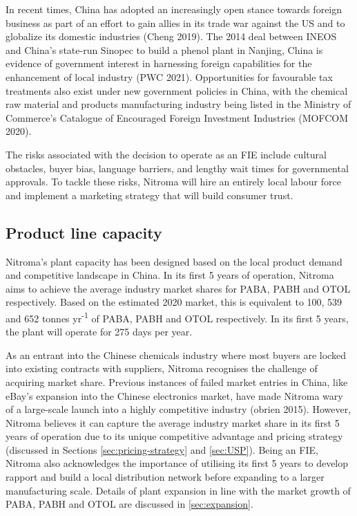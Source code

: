 In recent times, China has adopted an increasingly open stance towards foreign business as part of an effort to gain allies in its trade war against the US and to globalize its domestic industries (Cheng 2019). The 2014 deal between INEOS and China’s state-run Sinopec to build a phenol plant in Nanjing, China is evidence of government interest in harnessing foreign capabilities for the enhancement of local industry (PWC 2021). Opportunities for favourable tax treatments also exist under new government policies in China, with the chemical raw material and products manufacturing industry being listed in the Ministry of Commerce’s Catalogue of Encouraged Foreign Investment Industries (MOFCOM 2020). 

The risks associated with the decision to operate as an FIE include cultural obstacles, buyer bias, language barriers, and lengthy wait times for governmental approvals. To tackle these risks, Nitroma will hire an entirely local labour force and implement a marketing strategy that will build consumer trust.

\subsection{Product line capacity}
\label{sec:product-capacity}
Nitroma’s plant capacity has been designed based on the local product demand and competitive landscape in China. In its first 5 years of operation, Nitroma aims to achieve the average industry market shares for PABA, PABH and OTOL respectively. Based on the estimated 2020 market, this is equivalent to 100, 539 and 652 tonnes yr\textsuperscript{-1} of PABA, PABH and OTOL respectively. In its first 5 years, the plant will operate for 275 days per year.

As an entrant into the Chinese chemicals industry where most buyers are locked into existing contracts with suppliers, Nitroma recognises the challenge of acquiring market share. Previous instances of failed market entries in China, like eBay’s expansion into the Chinese electronics market, have made Nitroma wary of a large-scale launch into a highly competitive industry (obrien 2015). However, Nitroma believes it can capture the average industry market share in its first 5 years of operation due to its unique competitive advantage and pricing strategy (discussed in Sections \ref{sec:pricing-strategy} and \ref{sec:USP}). Being an FIE, Nitroma also acknowledges the importance of utilising its first 5 years to develop rapport and build a local distribution network before expanding to a larger manufacturing scale. Details of plant expansion in line with the market growth of PABA, PABH and OTOL are discussed in \cref{sec:expansion}.

